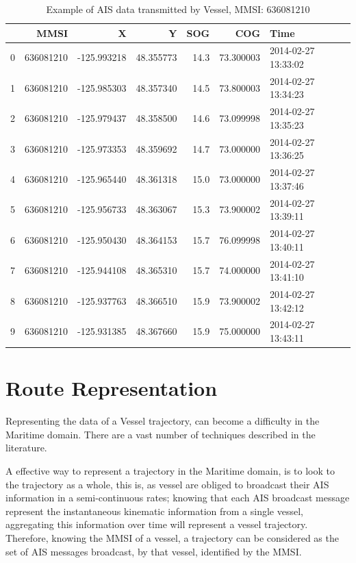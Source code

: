 \begin{table}[H]
  \centering
{\small
\begin{tabular}{lrrrrrl}
\toprule
{} &       MMSI &           X &          Y &   SOG &        COG &                Time \\
\midrule
0 &  636081210 & -125.993218 &  48.355773 &  14.3 &  73.300003 & 2014-02-27 13:33:02 \\
1 &  636081210 & -125.985303 &  48.357340 &  14.5 &  73.800003 & 2014-02-27 13:34:23 \\
2 &  636081210 & -125.979437 &  48.358500 &  14.6 &  73.099998 & 2014-02-27 13:35:23 \\
3 &  636081210 & -125.973353 &  48.359692 &  14.7 &  73.000000 & 2014-02-27 13:36:25 \\
4 &  636081210 & -125.965440 &  48.361318 &  15.0 &  73.000000 & 2014-02-27 13:37:46 \\
5 &  636081210 & -125.956733 &  48.363067 &  15.3 &  73.900002 & 2014-02-27 13:39:11 \\
6 &  636081210 & -125.950430 &  48.364153 &  15.7 &  76.099998 & 2014-02-27 13:40:11 \\
7 &  636081210 & -125.944108 &  48.365310 &  15.7 &  74.000000 & 2014-02-27 13:41:10 \\
8 &  636081210 & -125.937763 &  48.366510 &  15.9 &  73.900002 & 2014-02-27 13:42:12 \\
9 &  636081210 & -125.931385 &  48.367660 &  15.9 &  75.000000 & 2014-02-27 13:43:11 \\
\bottomrule
\end{tabular} }
\caption{Example of AIS data transmitted by Vessel, MMSI: 636081210}
\label{Table: TableAIS1}
\end{table}


\section{Route Representation}
Representing the data of a Vessel trajectory, can become a difficulty in the Maritime domain. There are a vast number of techniques described in the literature.

A effective way to represent a trajectory in the Maritime domain, is to look to the trajectory as a whole, this is, as vessel are obliged to broadcast their AIS information in a semi-continuous rates; knowing that each AIS broadcast message represent the instantaneous kinematic information from a single vessel, aggregating this information over time will represent a vessel trajectory. Therefore, knowing the MMSI of a vessel, a trajectory can be considered as the set of AIS messages broadcast, by that vessel, identified by the MMSI.


